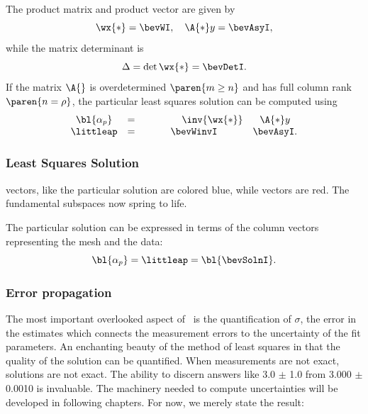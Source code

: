 The product matrix and product vector are given by
%
\begin{equation}
	\wx{*} = \bevWI, \quad \A{*}y = \bevAsyI,
\end{equation}
%
while the matrix determinant is
%
\begin{equation}
	\Delta = \det{\wx{*}} = \bevDetI.
\label{eq:ch-01:bevington determinant}
\end{equation}
%
If the matrix $\A{}$ is overdetermined $\paren{m\ge n}$ and has full column rank $\paren{n=\rho}$, the particular least squares solution can be computed using
%
\begin{equation}
	\begin{array}{cccc}
		\bl{\alpha_{p}} &=& \phantom{wwwww}\inv{\wx{*}} &\A{*}y \\
		\littleap &=&
		\bevWinvI & \bevAsyI.
	\end{array}
\label{eq:primus normal equations}
\end{equation}
%
\subsubsection{Least Squares Solution} 
 vectors, like the particular solution are colored blue, while  vectors are red. The fundamental subspaces now spring to life.
%

%
The particular solution can be expressed in terms of the column vectors representing the mesh and the data:
%
\begin{equation}
	\bl{\alpha_{p}} = 
	\littleap =
	\bl{\bevSolnI}.
\label{eq:bevington solution column vectors}
\end{equation}
%
\subsubsection{Error propagation} 
The most important overlooked aspect of \tmls \ is the quantification of $\sigma$, the error in the estimates which connects the measurement errors to the uncertainty of the fit parameters. An enchanting beauty of the method of least squares in that the quality of the solution can be quantified. When measurements are not exact, solutions are not exact. The ability to discern answers like 3.0 $\pm$ 1.0 from 3.000 $\pm$ 0.0010 is invaluable. The machinery needed to compute uncertainties will be developed in following chapters. For now, we merely state the result:


